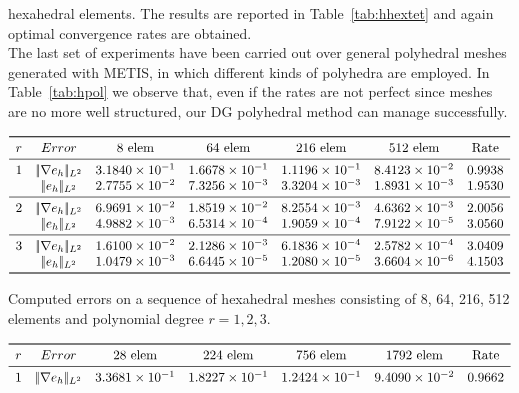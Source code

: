 \documentclass[12pt, a4paper]{article}
\theoremstyle{definition}
\theoremstyle{plain}
\theoremstyle{plain}
\theoremstyle{definition}
\begin{document}
hexahedral elements. The results are reported in Table~\ref{tab:hhextet} and 
again optimal convergence rates are obtained.\\
The last set of experiments have been carried out over general polyhedral 
meshes generated with METIS, in which different kinds of polyhedra are 
employed. In Table~\ref{tab:hpol} we observe that, even if the rates are not 
perfect since meshes are no more well structured, our DG polyhedral method can 
manage successfully.
\begin{table}[h!]\footnotesize
	\centering
	\[
	\begin{array}{ccccccc}
	\toprule
	r & Error & \text{8 elem} & \text{64 elem} & \text{216 elem} & 
	\text{512 elem} & \text{Rate} \\ 
	\midrule
	1 & |\!|\nabla e_{h}|\!|_{L^2} & 3.1840 \times 10^{-1} & 1.6678 \times 
	10^{-1} & 1.1196 \times 10^{-1} & 8.4123 \times 10^{-2} & 0.9938\\
	& |\!|e_{h}|\!|_{L^2} & 2.7755 \times 10^{-2} & 7.3256 \times 10^{-3} & 3.3204 \times 10^{-3} & 
	1.8931 \times 10^{-3} & 1.9530\\
	\midrule
	2 & |\!|\nabla e_{h}|\!|_{L^2} & 6.9691 \times 10^{-2} & 1.8519 \times 
	10^{-2} & 8.2554 \times 10^{-3} & 4.6362 \times 10^{-3} & 2.0056\\
	& |\!|e_{h}|\!|_{L^2} & 4.9882 \times 10^{-3} & 6.5314 \times 10^{-4} & 1.9059 \times 10^{-4} & 
	7.9122 \times 10^{-5} & 3.0560\\
	\midrule
	3 & |\!|\nabla e_{h}|\!|_{L^2} & 1.6100 \times 10^{-2} & 2.1286 \times 
	10^{-3} & 6.1836 \times 10^{-4} & 2.5782 \times 10^{-4} & 3.0409\\
	& |\!|e_{h}|\!|_{L^2} & 1.0479 \times 10^{-3} & 6.6445 \times 10^{-5} & 1.2080 \times 10^{-5} & 
	3.6604 \times 10^{-6} & 4.1503\\
	\bottomrule
	\end{array}
	\]
	\caption{Computed errors on a sequence of hexahedral meshes consisting of 
		8, 64, 216, 512 elements and polynomial degree $r=1,2,3$.} \label{tab:hhex}
	\[
	\begin{array}{ccccccc}
	\toprule
	r & Error & \text{28 elem} & \text{224 elem} & \text{756 elem} & 
	\text{1792 elem} & \text{Rate} \\ 
	\midrule
	1 & |\!|\nabla e_{h}|\!|_{L^2} & 3.3681 \times 10^{-1} & 1.8227 \times 
	10^{-1} & 1.2424 \times 10^{-1} & 9.4090 \times 10^{-2} & 0.9662\\

\end{array}\]
\end{table}
\end{document}
